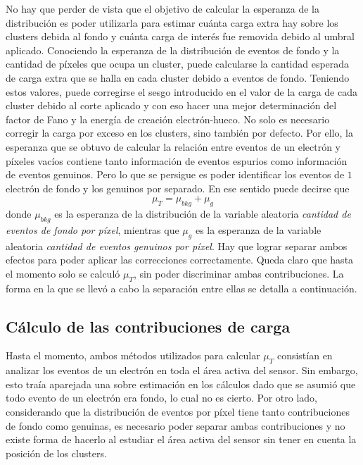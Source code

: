 No hay que perder de vista que el objetivo de calcular la esperanza de la distribución es poder utilizarla para estimar cuánta carga extra hay sobre los clusters debida al fondo y cuánta carga de interés fue removida debido al umbral aplicado. 
%
Conociendo la esperanza de la distribución de eventos de fondo y la cantidad de píxeles que ocupa un cluster, puede calcularse la cantidad esperada de carga extra que se halla en cada cluster debido a eventos de fondo. Teniendo estos valores, puede corregirse el sesgo introducido en el valor de la carga de cada cluster debido al corte aplicado y con eso hacer una mejor determinación del factor de Fano y la energía de creación electrón-hueco.
No solo es necesario corregir la carga por exceso en los clusters, sino también por defecto. Por ello, la esperanza que se obtuvo de calcular la relación entre eventos de un electrón y píxeles vacíos contiene tanto información de eventos espurios como información de eventos genuinos. Pero lo que se persigue es poder identificar los eventos de $1$ electrón de fondo y los genuinos por separado. En ese sentido puede decirse que 
\begin{equation*}
    \mu_{T} = \mu_{bkg} + \mu_{g}
\end{equation*}
donde $\mu_{bkg}$ es la esperanza de la distribución de la variable aleatoria \textit{cantidad de eventos de fondo por píxel}, mientras que $\mu_{g}$ es la esperanza de la variable aleatoria \textit{cantidad de eventos genuinos por píxel}. Hay que lograr separar ambos efectos para poder aplicar las correcciones correctamente. 
Queda claro que hasta el momento solo se calculó $\mu_{T}$, sin poder discriminar ambas contribuciones. La forma en la que se llevó a cabo la separación entre ellas se detalla a continuación.

\subsection{Cálculo de las contribuciones de carga}
\noindent Hasta el momento, ambos métodos utilizados para calcular $\mu_{T}$ consistían en analizar los eventos de un electrón en toda el área activa del sensor. Sin embargo, esto traía aparejada una sobre estimación en los cálculos dado que se asumió que todo evento de un electrón era fondo, lo cual no es cierto. Por otro lado, considerando que la distribución de eventos por píxel tiene tanto contribuciones de fondo como genuinas, es necesario poder separar ambas contribuciones y no existe forma de hacerlo al estudiar el área activa del sensor sin tener en cuenta la posición de los clusters.

